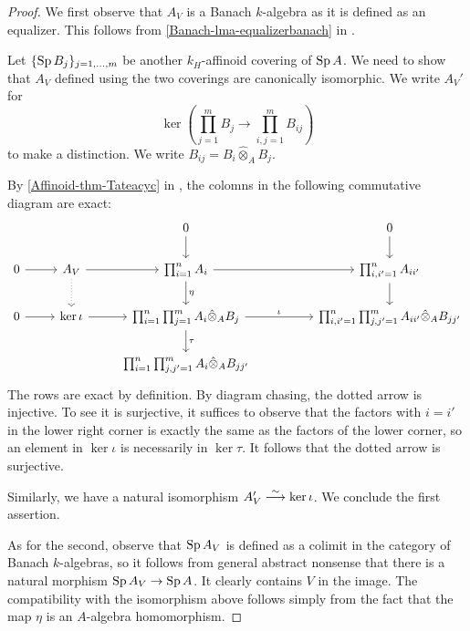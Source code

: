     \begin{proof}
        We first observe that $A_V$ is a Banach $k$-algebra as it is defined as an equalizer. This follows from \cref{Banach-lma-equalizerbanach} in .
    
        Let $\{\operatorname{Sp} B_j\}_{j=1,\ldots,m}$ be another $k_H$-affinoid covering of $\operatorname{Sp} A$. We need to show that $A_V$ defined using the two coverings are canonically isomorphic. We write $A_V'$ for  
        \[
            \ker  \left( \prod_{j=1}^m B_j \rightarrow \prod_{i,j=1}^m B_{ij}\right)
        \]  
        to make a distinction.
        We write $B_{ij}=B_i\hat{\otimes}_A B_j$. 
        
        By \cref{Affinoid-thm-Tateacyc} in , the colomns in the following commutative diagram are exact:
        \[
            \begin{tikzcd}
                &                                 & 0 \arrow[d]                                                                             &  & 0 \arrow[d]                                                       \\
    0 \arrow[r] & A_V \arrow[r] \arrow[d, dotted] & \prod_{i=1}^n A_i \arrow[d,"\eta"] \arrow[rr]                                                  &  & {\prod_{i,i'=1}^n A_{ii'}} \arrow[d]                              \\
    0 \arrow[r] & \ker \iota \arrow[r]            & \prod_{i=1}^n\prod_{j=1}^m A_i\hat{\otimes}_A B_j \arrow[d, "\tau"] \arrow[rr, "\iota"] &  & {\prod_{i,i'=1}^n\prod_{j,j'=1}^m A_{ii'}\hat{\otimes}_A B_{jj'}} \\
                &                                 & {\prod_{i=1}^n\prod_{j,j'=1}^m A_i\hat{\otimes}_A B_{jj'}}                              &  &                                                                  
    \end{tikzcd}  
        \]
        The rows are exact by definition. By diagram chasing, the dotted arrow is injective. To see it is surjective, it suffices to observe that the factors with $i=i'$ in the lower right corner is exactly the same as the factors of the lower corner, so an element in $\ker \iota$ is necessarily in $\ker \tau$. It follows that the dotted arrow is surjective.
    
        Similarly, we have a natural isomorphism $A_V'\stackrel{\sim}{\longrightarrow} \ker \iota$. We conclude the first assertion.
    
        As for the second, observe that $\operatorname{Sp} A_V$ is defined as a colimit in the category of Banach $k$-algebras, so it follows from general abstract nonsense that there is a natural morphism $\operatorname{Sp} A_V\rightarrow \operatorname{Sp} A$. It clearly contains $V$ in the image. The compatibility with the isomorphism above follows simply from the fact that the map $\eta$ is an $A$-algebra homomorphism.
    \end{proof}
    
